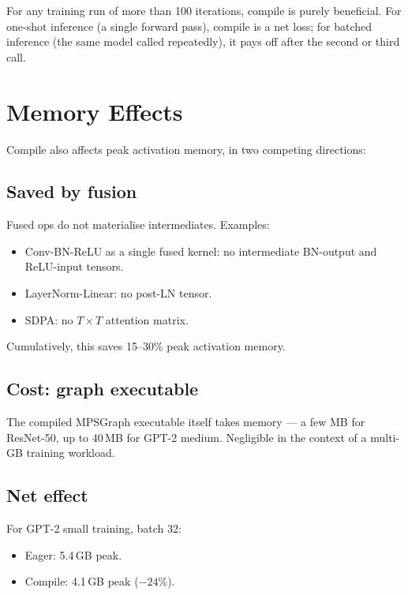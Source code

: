 For any training run of more than 100 iterations, compile is
purely beneficial. For one-shot inference (a single forward
pass), compile is a net loss; for batched inference (the same
model called repeatedly), it pays off after the second or third
call.

\section{Memory Effects}
\label{sec:graph_capture_wins:memory}

Compile also affects peak activation memory, in two competing
directions:

\subsection{Saved by fusion}
\label{ssec:graph_capture_wins:memory_saved}

Fused ops do not materialise intermediates. Examples:
\begin{itemize}
  \item Conv-BN-ReLU as a single fused kernel: no intermediate
    BN-output and ReLU-input tensors.
  \item LayerNorm-Linear: no post-LN tensor.
  \item SDPA: no $T \times T$ attention matrix.
\end{itemize}

Cumulatively, this saves 15--30\% peak activation memory.

\subsection{Cost: graph executable}
\label{ssec:graph_capture_wins:memory_cost}

The compiled MPSGraph executable itself takes memory --- a few
MB for ResNet-50, up to 40\,MB for GPT-2 medium. Negligible
in the context of a multi-GB training workload.

\subsection{Net effect}
\label{ssec:graph_capture_wins:memory_net}

For GPT-2 small training, batch 32:

\begin{itemize}
  \item Eager: 5.4\,GB peak.
  \item Compile: 4.1\,GB peak ($-24\%$).
\end{itemize}

